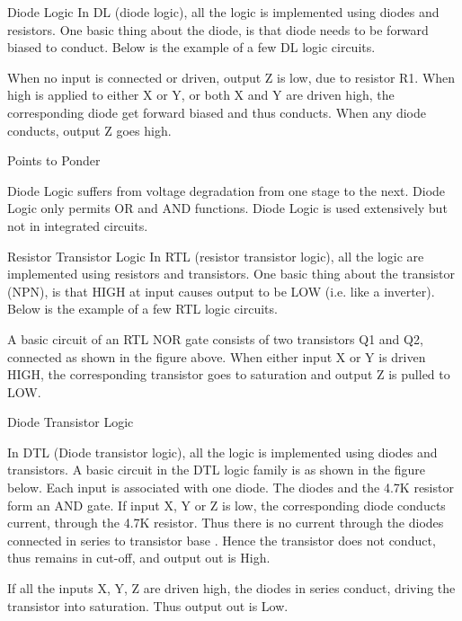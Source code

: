 Diode Logic
  In DL (diode logic), all the logic is implemented using diodes and resistors. One basic thing about the diode, is that diode needs to be forward biased to conduct. Below is the example of a few DL logic circuits.






  When no input is connected or driven, output Z is low, due to resistor R1. When high is applied to either X or Y, or both X and Y are driven high, the corresponding diode get forward biased and thus conducts. When any diode conducts, output Z goes high.



  Points to Ponder

  Diode Logic suffers from voltage degradation from one stage to the next.
Diode Logic only permits OR and AND functions.
Diode Logic is used extensively but not in integrated circuits.



   Resistor Transistor Logic
  In RTL (resistor transistor logic), all the logic are implemented using resistors and transistors. One basic thing about the transistor (NPN), is that HIGH at input causes output to be LOW (i.e. like a inverter). Below is the example of a few RTL logic circuits.






  A basic circuit of an RTL NOR gate consists of two transistors Q1 and Q2, connected as shown in the figure above. When either input X or Y is driven HIGH, the corresponding transistor goes to saturation and output Z is pulled to LOW.






   Diode Transistor Logic


  In DTL (Diode transistor logic), all the logic is implemented using diodes and transistors. A basic circuit in the DTL logic family is as shown in the figure below. Each input is associated with one diode. The diodes and the 4.7K resistor form an AND gate. If input X, Y or Z is low, the corresponding diode conducts current, through the 4.7K resistor. Thus there is no current through the diodes connected in series to transistor base . Hence the transistor does not conduct, thus remains in cut-off, and output out is High.



  If all the inputs X, Y, Z are driven high, the diodes in series conduct, driving the transistor into saturation. Thus output out is Low.






